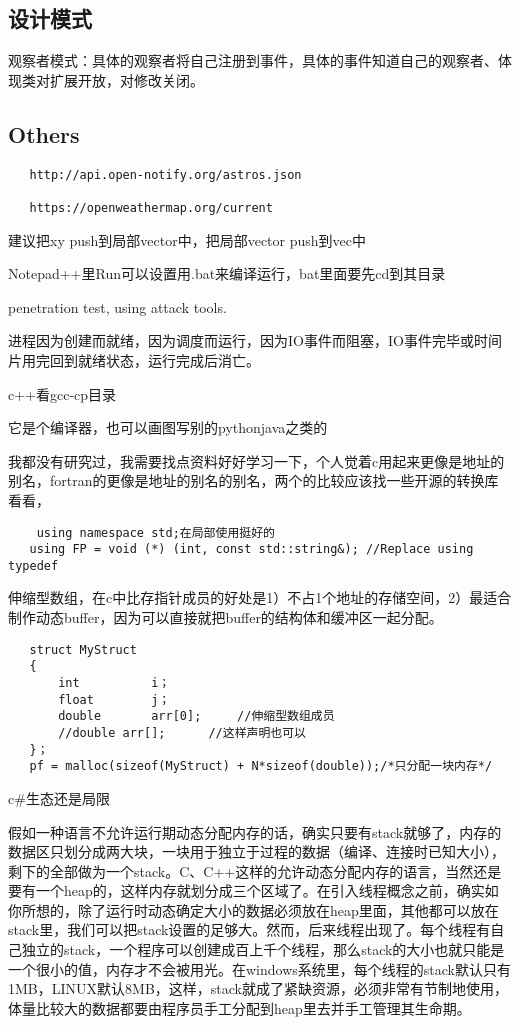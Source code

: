 \documentclass[UTF8]{../computerUniverse}
\begin{document}
\subsection{设计模式}
观察者模式：具体的观察者将自己注册到事件，具体的事件知道自己的观察者、体现类对扩展开放，对修改关闭。


\subsection{Others}




\begin{lstlisting}
   http://api.open-notify.org/astros.json

   https://openweathermap.org/current

\end{lstlisting}


建议把xy push到局部vector中，把局部vector push到vec中

Notepad++里Run可以设置用.bat来编译运行，bat里面要先cd到其目录

penetration test, using attack tools.

进程因为创建而就绪，因为调度而运行，因为IO事件而阻塞，IO事件完毕或时间片用完回到就绪状态，运行完成后消亡。

c++看gcc-cp目录

它是个编译器，也可以画图写别的pythonjava之类的

我都没有研究过，我需要找点资料好好学习一下，个人觉着c用起来更像是地址的别名，fortran的更像是地址的别名的别名，两个的比较应该找一些开源的转换库看看，

\begin{lstlisting}
    using namespace std;在局部使用挺好的
   using FP = void (*) (int, const std::string&); //Replace using typedef
\end{lstlisting}


伸缩型数组，在c中比存指针成员的好处是1）不占1个地址的存储空间，2）最适合制作动态buffer，因为可以直接就把buffer的结构体和缓冲区一起分配。
\begin{lstlisting}
   struct MyStruct
   {
       int			i；
       float		j；
       double		arr[0];		//伸缩型数组成员
       //double	arr[];		//这样声明也可以
   }；
   pf = malloc(sizeof(MyStruct) + N*sizeof(double));/*只分配一块内存*/
\end{lstlisting}
c\#生态还是局限


假如一种语言不允许运行期动态分配内存的话，确实只要有stack就够了，内存的数据区只划分成两大块，一块用于独立于过程的数据（编译、连接时已知大小），剩下的全部做为一个stack。C、C++这样的允许动态分配内存的语言，当然还是要有一个heap的，这样内存就划分成三个区域了。在引入线程概念之前，确实如你所想的，除了运行时动态确定大小的数据必须放在heap里面，其他都可以放在stack里，我们可以把stack设置的足够大。然而，后来线程出现了。每个线程有自己独立的stack，一个程序可以创建成百上千个线程，那么stack的大小也就只能是一个很小的值，内存才不会被用光。在windows系统里，每个线程的stack默认只有1MB，LINUX默认8MB，这样，stack就成了紧缺资源，必须非常有节制地使用，体量比较大的数据都要由程序员手工分配到heap里去并手工管理其生命期。
\end{document}
